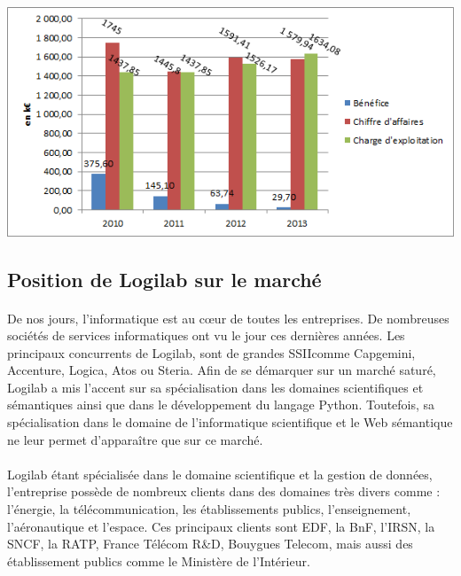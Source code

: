 \documentclass {report}
\begin{document}
\begin{center}
\includegraphics{compta.png}
\end{center}

\subsection{Position de Logilab sur le marché}
\paragraph{}
De nos jours, l'informatique est au cœur de toutes les entreprises. De nombreuses sociétés de services informatiques ont vu le jour ces dernières années. Les principaux concurrents de Logilab, sont de grandes SSII\footnotemark[3] comme Capgemini, Accenture, Logica, Atos ou Steria. Afin de se démarquer sur un marché saturé, Logilab a mis l'accent sur sa spécialisation dans les domaines scientifiques et sémantiques ainsi que dans le développement du langage Python. Toutefois, sa spécialisation dans le domaine de l'informatique scientifique et le Web sémantique ne leur permet d'apparaître que sur ce marché.


\paragraph{}
Logilab étant spécialisée dans le domaine scientifique et la gestion de données, l'entreprise possède de nombreux clients dans des domaines très divers comme : l'énergie, la télécommunication, les établissements publics, l'enseignement, l'aéronautique et l'espace. Ces principaux clients sont EDF, la BnF\footnotemark[1], l'IRSN\footnotemark[2], la SNCF, la  RATP, France Télécom R\&D, Bouygues Telecom, mais aussi des établissement publics comme le Ministère de l'Intérieur.
\end{document}
